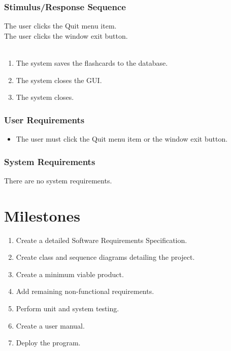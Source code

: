 \documentclass{scrreprt}
\begin{document}
    \subsection{Stimulus/Response Sequence}
        \begin{flushleft}
             The user clicks the Quit menu item. \\
             The user clicks the window exit button. \\
             \\
            \begin{enumerate}[1.]
                \item The system saves the flashcards to the database.
                \item The system closes the GUI.
                \item The system closes.
            \end{enumerate}
        \end{flushleft}

    \subsection{User Requirements}
        \begin{itemize}
            \item The user must click the Quit menu item or the window exit button.
        \end{itemize}

    \subsection{System Requirements}
        There are no system requirements.


\chapter{Milestones}
    \begin{enumerate}[1.]
        \item Create a detailed Software Requirements Specification.
        \item Create class and sequence diagrams detailing the project.
        \item Create a minimum viable product.
        \item Add remaining non-functional requirements.
        \item Perform unit and system testing.
        \item Create a user manual.
        \item Deploy the program.
    \end{enumerate}
\end{document}
